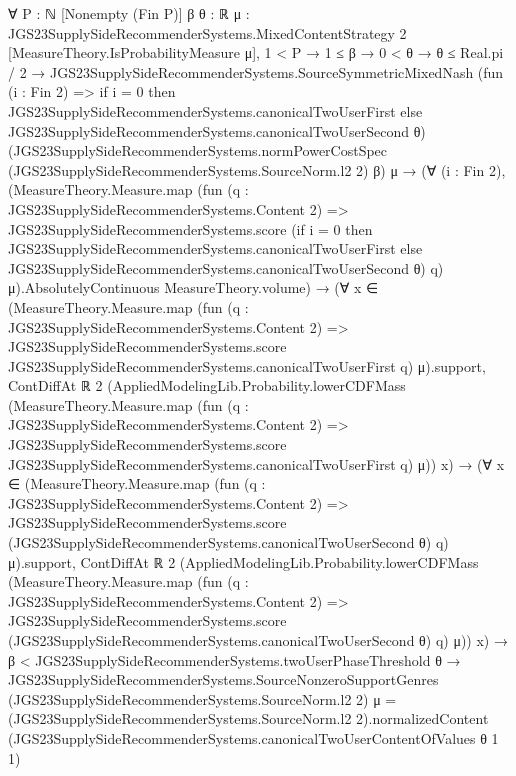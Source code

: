 \documentclass[10pt]{article}
\begin{document}
\begin{ReviewVerbatim}
∀ {P : ℕ} [Nonempty (Fin P)] {β θ : ℝ} {μ : JGS23SupplySideRecommenderSystems.MixedContentStrategy 2}
  [MeasureTheory.IsProbabilityMeasure μ],
  1 < P →
    1 ≤ β →
      0 < θ →
        θ ≤ Real.pi / 2 →
          JGS23SupplySideRecommenderSystems.SourceSymmetricMixedNash
              (fun (i : Fin 2) =>
                if i = 0 then JGS23SupplySideRecommenderSystems.canonicalTwoUserFirst
                else JGS23SupplySideRecommenderSystems.canonicalTwoUserSecond θ)
              (JGS23SupplySideRecommenderSystems.normPowerCostSpec (JGS23SupplySideRecommenderSystems.SourceNorm.l2 2)
                β)
              μ →
            (∀ (i : Fin 2),
                (MeasureTheory.Measure.map
                      (fun (q : JGS23SupplySideRecommenderSystems.Content 2) =>
                        JGS23SupplySideRecommenderSystems.score
                          (if i = 0 then JGS23SupplySideRecommenderSystems.canonicalTwoUserFirst
                          else JGS23SupplySideRecommenderSystems.canonicalTwoUserSecond θ)
                          q)
                      μ).AbsolutelyContinuous
                  MeasureTheory.volume) →
              (∀
                  x ∈
                    (MeasureTheory.Measure.map
                        (fun (q : JGS23SupplySideRecommenderSystems.Content 2) =>
                          JGS23SupplySideRecommenderSystems.score
                            JGS23SupplySideRecommenderSystems.canonicalTwoUserFirst q)
                        μ).support,
                  ContDiffAt ℝ 2
                    (AppliedModelingLib.Probability.lowerCDFMass
                      (MeasureTheory.Measure.map
                        (fun (q : JGS23SupplySideRecommenderSystems.Content 2) =>
                          JGS23SupplySideRecommenderSystems.score
                            JGS23SupplySideRecommenderSystems.canonicalTwoUserFirst q)
                        μ))
                    x) →
                (∀
                    x ∈
                      (MeasureTheory.Measure.map
                          (fun (q : JGS23SupplySideRecommenderSystems.Content 2) =>
                            JGS23SupplySideRecommenderSystems.score
                              (JGS23SupplySideRecommenderSystems.canonicalTwoUserSecond θ) q)
                          μ).support,
                    ContDiffAt ℝ 2
                      (AppliedModelingLib.Probability.lowerCDFMass
                        (MeasureTheory.Measure.map
                          (fun (q : JGS23SupplySideRecommenderSystems.Content 2) =>
                            JGS23SupplySideRecommenderSystems.score
                              (JGS23SupplySideRecommenderSystems.canonicalTwoUserSecond θ) q)
                          μ))
                      x) →
                  β < JGS23SupplySideRecommenderSystems.twoUserPhaseThreshold θ →
                    JGS23SupplySideRecommenderSystems.SourceNonzeroSupportGenres
                        (JGS23SupplySideRecommenderSystems.SourceNorm.l2 2) μ =
                      {(JGS23SupplySideRecommenderSystems.SourceNorm.l2 2).normalizedContent
                          (JGS23SupplySideRecommenderSystems.canonicalTwoUserContentOfValues θ 1 1)}
\end{ReviewVerbatim}
\end{document}
